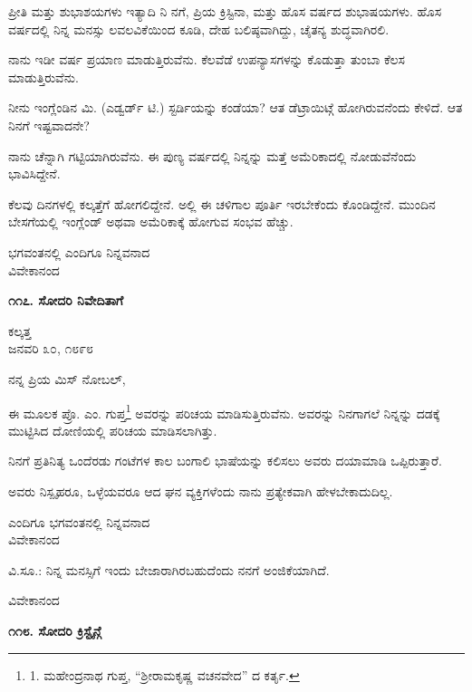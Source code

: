 ಪ್ರೀತಿ ಮತ್ತು ಶುಭಾಶಯಗಳು ಇತ್ಯಾದಿ ನಿ ನಗೆ, ಪ್ರಿಯ ಕ್ರಿಸ್ಟಿನಾ, ಮತ್ತು ಹೊಸ ವರ್ಷದ ಶುಭಾಷಯಗಳು. ಹೊಸ ವರ್ಷದಲ್ಲಿ ನಿನ್ನ ಮನಸ್ಸು ಲವಲವಿಕೆಯಿಂದ ಕೂಡಿ, ದೇಹ ಬಲಿಷ್ಠವಾಗಿದ್ದು, ಚೈತನ್ಯ ಶುದ್ಧವಾಗಿರಲಿ.

ನಾನು ಇಡೀ ವರ್ಷ ಪ್ರಯಾಣ ಮಾಡುತ್ತಿರುವೆನು. ಕೆಲವೆಡೆ ಉಪನ್ಯಾಸಗಳನ್ನು ಕೊಡುತ್ತಾ ತುಂಬಾ ಕೆಲಸ ಮಾಡುತ್ತಿರುವೆನು.

ನೀನು ಇಂಗ್ಲೆಂಡಿನ ಮಿ. (ಎಡ್ವರ್ಡ್ ಟಿ.) ಸ್ಟರ್ಡಿಯನ್ನು ಕಂಡೆಯಾ? ಆತ ಡೆಟ್ರಾಯಿಟ್ಗೆ ಹೋಗಿರುವನೆಂದು ಕೇಳಿದೆ. ಆತ ನಿನಗೆ ಇಷ್ಟವಾದನೇ?

ನಾನು ಚೆನ್ನಾಗಿ ಗಟ್ಟಿಯಾಗಿರುವೆನು. ಈ ಪುಣ್ಯ ವರ್ಷದಲ್ಲಿ ನಿನ್ನನ್ನು ಮತ್ತೆ ಅಮೆರಿಕಾದಲ್ಲಿ ನೋಡುವೆನೆಂದು ಭಾವಿಸಿದ್ದೇನೆ.

ಕೆಲವು ದಿನಗಳಲ್ಲಿ ಕಲ್ಕತ್ತೆಗೆ ಹೋಗಲಿದ್ದೇನೆ. ಅಲ್ಲಿ ಈ ಚಳಿಗಾಲ ಪೂರ್ತಿ ಇರಬೇಕೆಂದು ಕೊಂಡಿದ್ದೇನೆ. ಮುಂದಿನ ಬೇಸಗೆಯಲ್ಲಿ ಇಂಗ್ಲೆಂಡ್ ಅಥವಾ ಅಮೆರಿಕಾಕ್ಕೆ ಹೋಗುವ ಸಂಭವ ಹೆಚ್ಚು.

\begin{flushright}
ಭಗವಂತನಲ್ಲಿ ಎಂದಿಗೂ ನಿನ್ನವನಾದ\\ವಿವೇಕಾನಂದ
\end{flushright}

\begin{center}
\textbf{೧೧೭. ಸೋದರಿ ನಿವೇದಿತಾಗೆ}
\end{center}

\begin{flushright}
ಕಲ್ಕತ್ತ\\ಜನವರಿ ೩೦, ೧೮೯೮
\end{flushright}

ನನ್ನ ಪ್ರಿಯ ಮಿಸ್ ನೋಬಲ್,

ಈ ಮೂಲಕ ಪ್ರೊ. ಎಂ. ಗುಪ್ತ\footnote{1. ಮಹೇಂದ್ರನಾಥ ಗುಪ್ತ, “ಶ‍್ರೀರಾಮಕೃಷ್ಣ ವಚನವೇದ” ದ ಕರ್ತೃ.} ಅವರನ್ನು ಪರಿಚಯ ಮಾಡಿಸುತ್ತಿರುವೆನು. ಅವರನ್ನು ನಿನಗಾಗಲೆ ನಿನ್ನನ್ನು ದಡಕ್ಕೆ ಮುಟ್ಟಿಸಿದ ದೋಣಿಯಲ್ಲಿ ಪರಿಚಯ ಮಾಡಿಸಲಾಗಿತ್ತು.

ನಿನಗೆ ಪ್ರತಿನಿತ್ಯ ಒಂದೆರಡು ಗಂಟೆಗಳ ಕಾಲ ಬಂಗಾಲಿ ಭಾಷೆಯನ್ನು ಕಲಿಸಲು ಅವರು ದಯಾಮಾಡಿ ಒಪ್ಪಿರುತ್ತಾರೆ.

ಅವರು ನಿಸ್ಪೃಹರೂ, ಒಳ್ಳೆಯವರೂ ಆದ ಘನ ವ್ಯಕ್ತಿಗಳೆಂದು ನಾನು ಪ್ರತ್ಯೇಕವಾಗಿ ಹೇಳಬೇಕಾದುದಿಲ್ಲ.

\begin{flushright}
ಎಂದಿಗೂ ಭಗವಂತನಲ್ಲಿ ನಿನ್ನವನಾದ\\ವಿವೇಕಾನಂದ
\end{flushright}

ವಿ.ಸೂ.: ನಿನ್ನ ಮನಸ್ಸಿಗೆ ಇಂದು ಬೇಜಾರಾಗಿರಬಹುದೆಂದು ನನಗೆ ಅಂಜಿಕೆಯಾಗಿದೆ.

\begin{flushright}
ವಿವೇಕಾನಂದ
\end{flushright}

\begin{center}
\textbf{೧೧೮. ಸೋದರಿ ಕ್ರಿಸ್ಟೈನ್ಗೆ}
\end{center}

